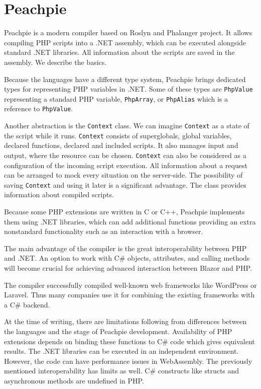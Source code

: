 \section{Peachpie}

Peachpie \cite{online:peachpie} is a modern compiler based on Roslyn and Phalanger project.
It allows compiling PHP scripts into a .NET assembly, which can be executed alongside standard .NET libraries.
All information about the scripts are saved in the assembly.
We describe the basics.
\par
Because the languages have a different type system, Peachpie brings dedicated types for representing PHP variables in .NET.
Some of these types are \texttt{PhpValue} representing a standard PHP variable, \texttt{PhpArray}, or \texttt{PhpAlias} which is a reference to \texttt{PhpValue}.
\par
Another abstraction is the \texttt{Context} class.
We can imagine \texttt{Context} as a state of the script while it runs.
\texttt{Context} consists of superglobals, global variables, declared functions, declared and included scripts.
It also manages input and output, where the resource can be chosen.
\texttt{Context} can also be considered as a configuration of the incoming script execution.
All information about a request can be arranged to mock every situation on the server-side.
The possibility of saving \texttt{Context} and using it later is a significant advantage.
The class provides information about compiled scripts.
\par
Because some PHP extensions are written in C or C++, Peachpie implements them using .NET libraries, which can add additional functions providing an extra nonstandard functionality such as an interaction with a browser.
\par
The main advantage of the compiler is the great interoperability between PHP and .NET.
An option to work with C\# objects, attributes, and calling methods will become crucial for achieving advanced interaction between Blazor and PHP.
\par
The compiler successfully compiled well-known web frameworks like WordPress or Laravel.
Thus many companies use it for combining the existing frameworks with a C\# backend.
\par
At the time of writing, there are limitations following from differences between the languages and the stage of Peachpie development.
Availability of PHP extensions depends on binding these functions to C\# code which gives equivalent results. 
The .NET libraries can be executed in an independent environment. 
However, the code can have performance issues in WebAssembly.
The previously mentioned interoperability has limits as well.
C\# constructs like structs and asynchronous methods are undefined in PHP.
